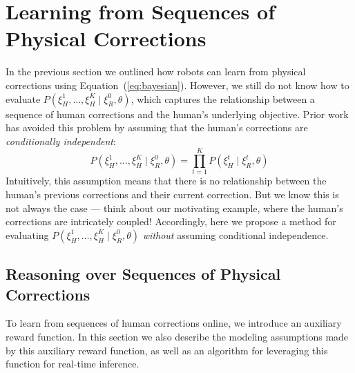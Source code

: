 \section{Learning from Sequences of Physical Corrections}
\label{sec:approach}

In the previous section we outlined how robots can learn from physical corrections using Equation~(\ref{eq:bayesian}). However, we still do not know how to evaluate $P(\xi_H^1, \ldots, \xi_H^K \mid \xi_R^0, \theta)$, which captures the relationship between a sequence of human corrections and the human's underlying objective. Prior work \cite{bajcsy2017learning, bajcsy2018learning, losey2018including, bobu2020quantifying} has avoided this problem by assuming that the human's corrections are \textit{conditionally independent}:
\begin{equation} \label{eq:independent}
    P(\xi_H^1, \ldots, \xi_H^K \mid \xi_R^0, \theta) = \prod_{t = 1}^K P(\xi_H^t \mid \xi_R^t, \theta)
\end{equation}
Intuitively, this assumption means that there is no relationship between the human's previous corrections and their current correction. But we know this is not always the case --- think about our motivating example, where the human's corrections are intricately coupled! Accordingly, here we propose a method for evaluating $P(\xi_H^1, \ldots, \xi_H^K \mid \xi_R^0, \theta)$ \textit{without} assuming conditional independence.

\subsection{Reasoning over Sequences of Physical Corrections}
\label{sec:approach:sequence}

To learn from sequences of human corrections online, we introduce an auxiliary reward function. In this section we also describe the modeling assumptions made by this auxiliary reward function, as well as an algorithm for leveraging this function for real-time inference.


